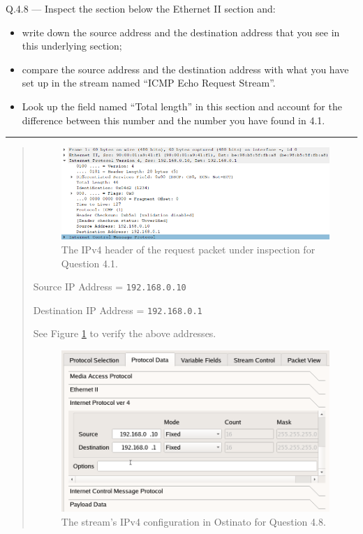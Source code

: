 \documentclass{article}
\newcommand\Que[2]{%
\begin{samepage}
\leavevmode\par
\noindent
Q.#1 --- #2\par\vspace{10pt}\hrule\vspace{10pt}
\end{samepage}}
\newenvironment{ans}
{\fbox{Answer}\begin{quote}\nopagebreak}
{\end{quote}}
\begin{document}
\newpage

\Que{4.8}{Inspect the section below the Ethernet II section and:
\begin{itemize}
\item write down the source address and the destination address
      that you see in this underlying section;
\item compare the source address and the destination address with
      what you have set up in the stream named ``ICMP Echo
      Request Stream''.
\item Look up the field named ``Total length'' in this section
      and account for the difference between this number and the
      number you have found in 4.1.
\end{itemize}}

\begin{ans}
\begin{figure}[H]
\centering
\includegraphics[width=14cm]{data/q4.8-ip-header.png}
\caption{The IPv4 header of the request packet under
inspection for Question 4.1.}
\label{fig:ip-header-for-q4.8}
\end{figure}

Source IP Address = \texttt{192.168.0.10}

Destination IP Address = \texttt{192.168.0.1}

See Figure \ref{fig:ip-header-for-q4.8} to verify the above
addresses.

\begin{figure}[H]
\centering
\includegraphics[width=14cm]{data/q4.8-stream-config.png}
\caption{The stream's IPv4 configuration in Ostinato for Question 4.8.}
\label{fig:stream-config-for-q4.8}
\end{figure}


\end{ans}
\end{document}
